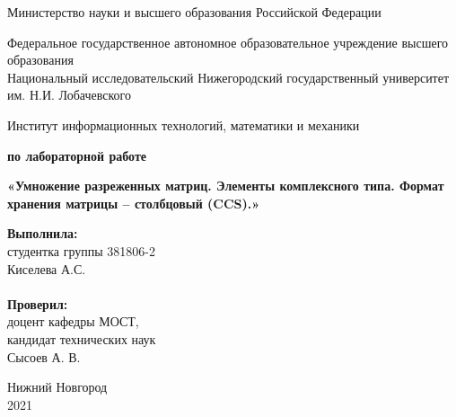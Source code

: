 \documentclass{report}
\begin{document}
\begin{titlepage}

\begin{center}
Министерство науки и высшего образования Российской Федерации
\end{center}

\begin{center}
Федеральное государственное автономное образовательное учреждение высшего образования \\
Национальный исследовательский Нижегородский государственный университет им. Н.И. Лобачевского
\end{center}

\begin{center}
Институт информационных технологий, математики и механики
\end{center}

\vspace{4em}

\begin{center}
\textbf{ по лабораторной работе} \\
\end{center}
\begin{center}
\textbf{\Large«Умножение разреженных матриц. Элементы комплексного типа. Формат хранения матрицы – столбцовый (CCS).»} \\
\end{center}

\vspace{4em}

\newbox{\lbox}
\newlength{\maxl}
\setlength{\maxl}{\wd\lbox}
\hfill\parbox{7cm}{
\hspace*{5cm}\hspace*{-5cm}\textbf{Выполнила:} \\ студентка группы 381806-2 \\ Киселева А.С.\\
\\
\hspace*{5cm}\hspace*{-5cm}\textbf{Проверил:}\\ доцент кафедры МОСТ, \\ кандидат технических наук \\ Сысоев А. В.\\
}
\vspace{\fill}

\begin{center} Нижний Новгород \\ 2021 \end{center}

\end{titlepage}
\end{document}
